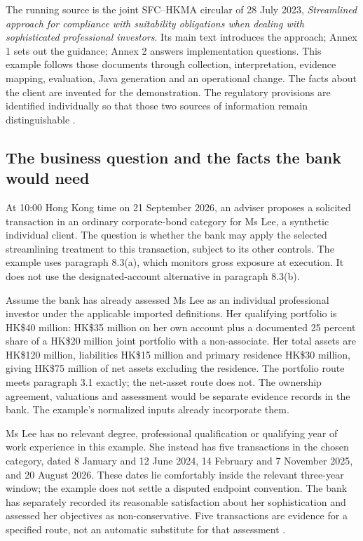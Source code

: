 \label{merge:P-01b-complete-dry-run:00}

\label{sec:dry-run}

The running source is the joint SFC--HKMA circular of 28 July 2023,
\emph{Streamlined approach for compliance with suitability obligations when
dealing with sophisticated professional investors}. Its main text introduces
the approach; Annex 1 sets out the guidance; Annex 2 answers implementation
questions. This example follows those documents through collection,
interpretation, evidence mapping, evaluation, Java generation and an operational
change. The facts about the client are invented for the demonstration. The
regulatory provisions are identified individually so that those two sources of
information remain distinguishable \citep{sfcspi,sfcspiannex1,sfcspiannex2}.

\subsection{The business question and the facts the bank would need}
\label{merge:P-01b-complete-dry-run:01}


At 10:00 Hong Kong time on 21 September 2026, an adviser proposes a solicited
transaction in an ordinary corporate-bond category for Ms Lee, a synthetic
individual client. The question is whether the bank may apply the selected
streamlining treatment to this transaction, subject to its other controls.
The example uses paragraph 8.3(a), which monitors gross exposure at execution.
It does not use the designated-account alternative in paragraph 8.3(b).

Assume the bank has already assessed Ms Lee as an individual professional
investor under the applicable imported definitions. Her qualifying portfolio is
HK\$40 million: HK\$35 million on her own account plus a documented 25 percent
share of a HK\$20 million joint portfolio with a non-associate. Her total assets
are HK\$120 million, liabilities HK\$15 million and primary residence HK\$30
million, giving HK\$75 million of net assets excluding the residence. The
portfolio route meets paragraph 3.1 exactly; the net-asset route does not.
The ownership agreement, valuations and assessment would be separate evidence
records in the bank. The example's normalized inputs already incorporate them.

Ms Lee has no relevant degree, professional qualification or qualifying year of
work experience in this example. She instead has five transactions in the
chosen category, dated 8 January and 12 June 2024, 14 February and 7 November
2025, and 20 August 2026. These dates lie comfortably inside the relevant
three-year window; the example does not settle a disputed endpoint convention.
The bank has separately recorded its reasonable satisfaction about her
sophistication and assessed her objectives as non-conservative. Five transactions
are evidence for a specified route, not an automatic substitute for that
assessment \citep[Annex 1, paras.~4.1, 5.1, 7.3]{sfcspiannex1}.

